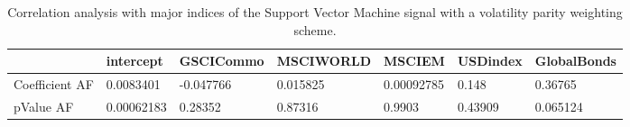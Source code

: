 \begin{table}[H]
\centering
\begin{tabular}{lllllll}
& intercept & GSCICommo & MSCIWORLD & MSCIEM & USDindex & GlobalBonds \\ 
\hline 
Coefficient AF & 0.0083401 & -0.047766 & 0.015825 & 0.00092785 & 0.148 & 0.36765 \\ 
pValue AF & 0.00062183 & 0.28352 & 0.87316 & 0.9903 & 0.43909 & 0.065124 \\ 
\hline
\end{tabular}
\caption{Correlation analysis with major indices of the Support Vector Machine signal with a volatility parity weighting scheme.}
\label{SVM_MODEL_AFACTOR}
\end{table}